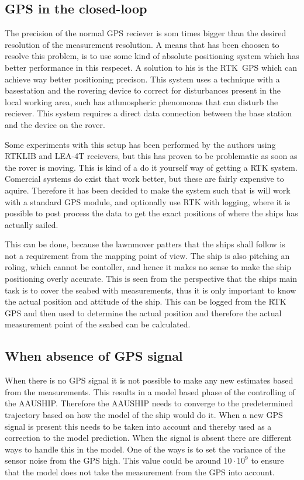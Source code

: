 \subsection{GPS in the closed-loop}

The precision of the normal \ac{GPS} reciever is som times bigger than the desired resolution of the measurement resolution. A means that has been choosen to resolve this problem, is to use some kind of absolute positioning system which has better performance in this respecet. A solution to his is the \ac{RTK}\ \ac{GPS} which can achieve way better positioning precison. This system uses a technique with a basestation and the rovering device to correct for disturbances present in the local working area, such has athmospheric phenomonas that can disturb the reciever. This system requires a direct data connection between the base station and the device on the rover.

Some experiments with this setup has been performed by the authors using RTKLIB and LEA-4T recievers, but this has proven to be problematic as soon as the rover is moving. This is kind of a do it yourself way of getting a \ac{RTK} system. Comercial systems do exist that work better, but these are fairly expensive to aquire. Therefore it has been decided to make the system such that is will work with a standard \ac{GPS} module, and optionally use \ac{RTK} with logging, where it is possible to post process the data to get the exact positions of where the ships has actually sailed.

This can be done, because the lawnmover patters that the ships shall follow is not a requirement from the mapping point of view.  The ship is also pitching an roling, which cannot be contoller, and hence it makes no sense to make the ship positioning overly accurate. This is seen from the perspective that the ships main task is to cover the seabed with measurements, thus it is only important to know the actual position and attitude of the ship. This can be logged from the \ac{RTK} \ac{GPS} and then used to determine the actual position and therefore the actual measurement point of the seabed can be calculated.

\subsection{When absence of \ac{GPS} signal}
When there is no \ac{GPS} signal it is not possible to make any new estimates based from the measurements. This results in a model based phase of the controlling of the AAUSHIP. Therefore the AAUSHIP needs to converge to the predetermined trajectory based on how the model of the ship would do it. When a new \ac{GPS} signal is present this needs to be taken into account and thereby used as a correction to the model prediction. When the signal is absent there are different ways to handle this in the model. One of the ways is to set the variance of the sensor noise from the \ac{GPS} high. This value could be around $10 \cdot 10^9$ to ensure that the model does not take the measurement from the \ac{GPS} into account.

